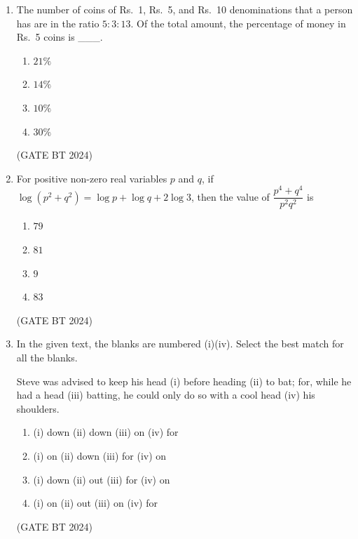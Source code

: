 \documentclass[journal,12pt,onecolumn]{IEEEtran}
\theoremstyle{remark}
\begin{document}
\begin{enumerate}
\item The number of coins of Rs.~1, Rs.~5, and Rs.~10 denominations that a person has are in the ratio $5:3:13$. Of the total amount, the percentage of money in Rs.~5 coins is \_\_\_.



\begin{multicols}{2}
\begin{enumerate}
    \item $21\%$
    \item $14\%$
    \item $10\%$
    \item $30\%$
\end{enumerate}
\end{multicols}
\hfill(GATE BT 2024)

\item 
For positive non-zero real variables $p$ and $q$, if $\log(p^2+q^2)=\log p+\log q+2\log 3$, then the value of $\dfrac{p^4+q^4}{p^2 q^2}$ is
\begin{multicols}{2}
\begin{enumerate}
    \item $79$
    \item $81$
    \item $9$
    \item $83$
\end{enumerate}
\end{multicols}
\hfill(GATE BT 2024)

\item 
In the given text, the blanks are numbered (i)(iv). Select the best match for all the blanks. 

Steve was advised to keep his head (i) before heading (ii) to bat; for, while he had a head (iii) batting, he could only do so with a cool head (iv) his shoulders. 
\begin{multicols}{2}
\begin{enumerate}
    \item (i) down (ii) down (iii) on (iv) for
    \item (i) on (ii) down (iii) for  (iv) on
    \item (i) down (ii) out (iii) for (iv) on
    \item (i) on (ii) out  (iii) on (iv) for
\end{enumerate}
\end{multicols}
\hfill(GATE BT 2024)


\end{enumerate}
\end{document}
